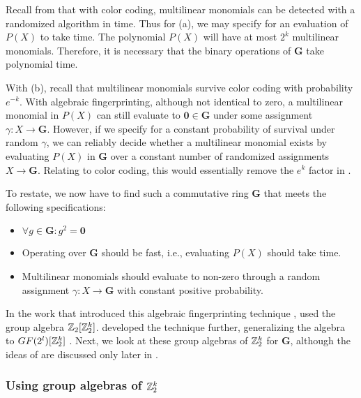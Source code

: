 Recall from  
that with color coding, multilinear monomials can be detected with a 
randomized algorithm in  time. Thus for (a), we may specify for 
an evaluation of $P(X)$ to take  time. The polynomial $P(X)$ 
will have at most $2^k$ multilinear monomials. Therefore, 
it is necessary that the binary operations 
of $\mathbf{G}$ take polynomial time.

With (b), recall that multilinear monomials 
survive color coding with probability $e^{-k}$. 
With algebraic fingerprinting, although not identical to zero, a multilinear monomial in $P(X)$ 
can still evaluate to $\mathbf{0} \in \mathbf{G}$ under some assignment $\gamma \colon X \to \mathbf{G}$. 
However, if we specify for a constant 
probability of survival under random $\gamma$, we can reliably decide whether a multilinear monomial exists 
by evaluating $P(X)$ in $\mathbf{G}$ over a constant number of 
randomized assignments $X \to \mathbf{G}$. Relating to color coding, 
this would essentially remove the 
$e^k$ factor in .

To restate, we now have to find such a commutative ring $\mathbf{G}$ that 
meets the following specifications: 
\begin{itemize}
  \item $\forall g \in \mathbf{G} \colon g^2 = \mathbf{0}$
  \item Operating over $\mathbf{G}$ should be fast, i.e., evaluating 
  $P(X)$ should take  time.
  \item Multilinear monomials should evaluate to non-zero
  through a random assignment 
  $\gamma \colon X \to \mathbf{G}$ with constant positive probability.
\end{itemize}

In the work that introduced 
this algebraic fingerprinting technique \cite{Koutis08}, 
\citeauthor{Koutis08} used the group algebra $\mathbb Z_2[\mathbb Z_2^k]$. 
\citeauthor{Williams09} developed the technique further, 
generalizing the algebra to $GF(2^{l})[\mathbb Z_2^k]$ \cite{Williams09}. 
Next, we look at these group algebras of $\mathbb Z_2^k$ for $\mathbf{G}$, 
although the ideas of \citeauthor{Williams09} are discussed only 
later in .

\subsubsection{Using group algebras of $\mathbb Z_2^k$}

